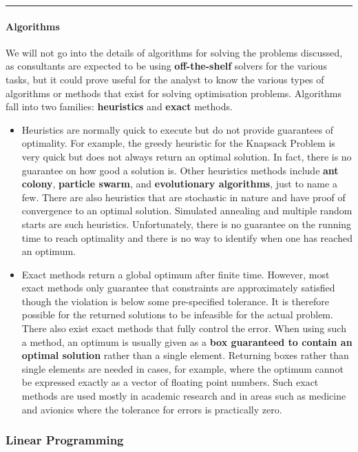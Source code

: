 \begin{center}\rule{0.5\linewidth}{.4pt}\end{center}

\paragraph{Algorithms}
We will not go into the details of algorithms for solving the
problems discussed, as consultants are expected to be using \textbf{off-the-shelf}
solvers for the various tasks, but it could prove useful for the analyst to know the 
various types of algorithms or methods that exist for solving
optimisation problems.
\newl Algorithms fall into two families: \textbf{heuristics} and \textbf{exact} methods.\begin{itemize}[noitemsep]
\item Heuristics are normally quick to execute but do not provide guarantees
of optimality. For example, the greedy heuristic for the Knapsack
Problem is very quick but does not always return an optimal solution. In
fact, there is no guarantee on how good a solution is. Other heuristics
methods include \textbf{ant colony}, \textbf{particle swarm}, and \textbf{evolutionary algorithms},
just to name a few. There are also heuristics that are stochastic in
nature and have proof of convergence to an optimal solution. Simulated
annealing and multiple random starts are such heuristics. Unfortunately,
there is no guarantee on the running time to reach optimality and there
is no way to identify when one has reached an optimum.
\item Exact methods return a global optimum after finite time. However, most
exact methods only guarantee that constraints are approximately
satisfied though the violation is below some pre-specified tolerance. It
is therefore possible for the returned solutions to be infeasible for
the actual problem. There also exist exact methods that fully control
the error. When using such a method, an optimum is usually given as a
\textbf{box guaranteed to contain an optimal solution} rather than a single
element. Returning boxes rather than single elements are needed in
cases, for example, where the optimum cannot be expressed exactly as a
vector of floating point numbers. Such exact methods are used mostly in
academic research and in areas such as medicine and avionics where the
tolerance for errors is practically zero.
\end{itemize}

\subsubsection{Linear Programming}

